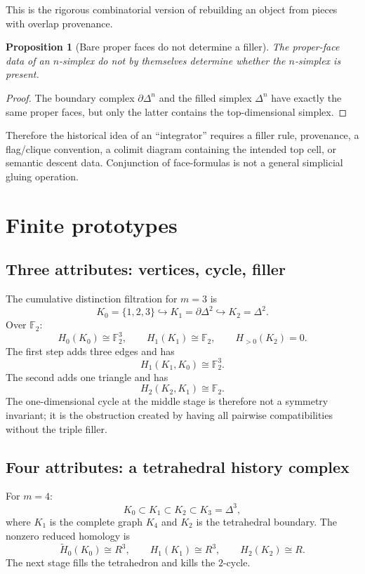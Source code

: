\documentclass[11pt]{article}
\newtheorem{proposition}[theorem]{Proposition}
\newcommand{\Ftwo}{\mathbb F_2}
\begin{document}
This is the rigorous combinatorial version of rebuilding an object from pieces with overlap provenance.

\begin{proposition}[Bare proper faces do not determine a filler]
The proper-face data of an $n$-simplex do not by themselves determine whether the $n$-simplex is present.
\end{proposition}
\begin{proof}
The boundary complex $\partial\Delta^n$ and the filled simplex $\Delta^n$ have exactly the same proper faces, but only the latter contains the top-dimensional simplex.
\end{proof}

Therefore the historical idea of an ``integrator'' requires a filler rule, provenance, a flag/clique convention, a colimit diagram containing the intended top cell, or semantic descent data.  Conjunction of face-formulas is not a general simplicial gluing operation.

\section{Finite prototypes}

\subsection{Three attributes: vertices, cycle, filler}
The cumulative distinction filtration for $m=3$ is
\[
K_0=\{1,2,3\}
\hookrightarrow
K_1=\partial\Delta^2
\hookrightarrow
K_2=\Delta^2.
\]
Over $\Ftwo$:
\[
H_0(K_0)\cong\Ftwo^3,
\qquad
H_1(K_1)\cong\Ftwo,
\qquad
H_{>0}(K_2)=0.
\]
The first step adds three edges and has
\[
H_1(K_1,K_0)\cong\Ftwo^3.
\]
The second adds one triangle and has
\[
H_2(K_2,K_1)\cong\Ftwo.
\]
The one-dimensional cycle at the middle stage is therefore not a symmetry invariant; it is the obstruction created by having all pairwise compatibilities without the triple filler.

\subsection{Four attributes: a tetrahedral history complex}
For $m=4$:
\[
K_0\subset K_1\subset K_2\subset K_3=\Delta^3,
\]
where $K_1$ is the complete graph $K_4$ and $K_2$ is the tetrahedral boundary.  The nonzero reduced homology is
\[
\widetilde H_0(K_0)\cong R^3,\qquad
H_1(K_1)\cong R^3,\qquad
H_2(K_2)\cong R.
\]
The next stage fills the tetrahedron and kills the $2$-cycle.
\end{document}
